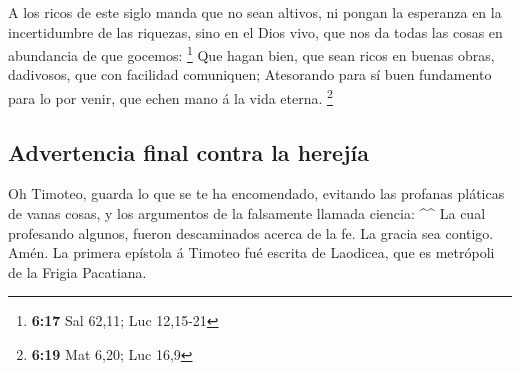  A los ricos de este siglo manda que no sean altivos, ni
pongan la esperanza en la incertidumbre de las riquezas, sino en el Dios
vivo, que nos da todas las cosas en abundancia de que gocemos:
\footnote{\textbf{6:17} Sal 62,11; Luc 12,15-21}  Que hagan
bien, que sean ricos en buenas obras, dadivosos, que con facilidad
comuniquen;  Atesorando para sí buen fundamento para lo por
venir, que echen mano á la vida eterna. \footnote{\textbf{6:19} Mat
  6,20; Luc 16,9}

\hypertarget{advertencia-final-contra-la-herejuxeda}{%
\subsection{Advertencia final contra la
herejía}\label{advertencia-final-contra-la-herejuxeda}}

 Oh Timoteo, guarda lo que se te ha encomendado, evitando
las profanas pláticas de vanas cosas, y los argumentos de la falsamente
llamada ciencia: \^{}\^{}  La cual profesando algunos,
fueron descaminados acerca de la fe. La gracia sea contigo. Amén. La
primera epístola á Timoteo fué escrita de Laodicea, que es metrópoli de
la Frigia Pacatiana.
